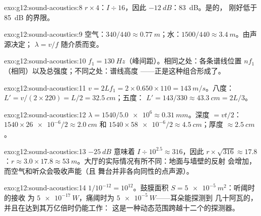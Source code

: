 \begin{solution}{exo:g12:sound-acoustics:8}
$r \times 4$：$I \div 16$，因此 $-\qty{12}{dB}$：\qty{83}{dB}。是的，
刚好低于 \qty{85}{dB} 的界限。
\end{solution}

\begin{solution}{exo:g12:sound-acoustics:9}
空气：$340/440 \approx \qty{0.77}{m}$；水：$1500/440 \approx
\qty{3.4}{m}$。由声源决定；
$\lambda = v/f$ 随介质而变。
\end{solution}

\begin{solution}{exo:g12:sound-acoustics:10}
$f_1 = \qty{130}{Hz}$（峰间距）。相同之处：各条谱线位置
$nf_1$（相同）以及总强度；不同之处：谱线高度
——正是这种组合形成了。
\end{solution}

\begin{solution}{exo:g12:sound-acoustics:11}
$v = 2Lf_1 = 2 \times 0.650 \times 110 = \qty{143}{m/s}$。八度：
$L' = v/(2 \times 220) = L/2 = \qty{32.5}{cm}$；五度：
$L' = 143/330 \approx \qty{43.3}{cm} = 2L/3$。
\end{solution}

\begin{solution}{exo:g12:sound-acoustics:12}
$\lambda = 1540/\num{5.0e6} \approx \qty{0.31}{mm}$。深度 $= vt/2$：
$1540 \times \num{26e-6}/2 \approx \qty{2.0}{cm}$ 和
$1540 \times \num{58e-6}/2 \approx \qty{4.5}{cm}$；厚度
$\approx \qty{2.5}{cm}$。
\end{solution}

\begin{solution}{exo:g12:sound-acoustics:13}
$-\qty{25}{dB}$ 意味着 $I \div 10^{2.5} \approx 316$，因此
$r \times \sqrt{316} \approx 17.8$：$r \approx 3.0 \times 17.8
\approx \qty{53}{m}$。大厅的实际情况有所不同：地面与墙壁的反射
会增加，而空气和听众会吸收声能（且
舞台并非各向同性的点声源）。
\end{solution}

\begin{solution}{exo:g12:sound-acoustics:14}
$1/10^{-12} = 10^{12}$。鼓膜面积 $S = \qty{5e-5}{m^2}$：听阈时的接收
为 $\qty{5e-17}{W}$，痛阈时为 $\qty{5e-5}{W}$——耳朵能探测到
几十阿瓦的，并且在达到其万亿倍时仍能工作：
这是一种动态范围跨越十二个的探测器。
\end{solution}

